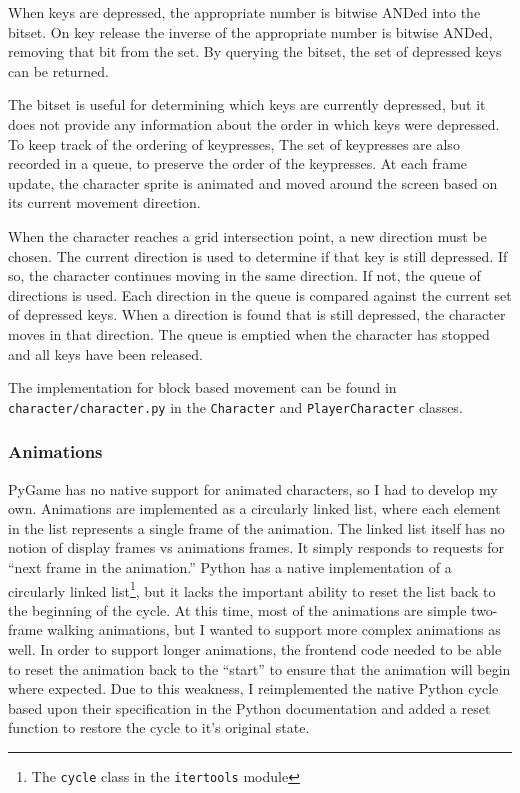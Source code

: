\documentclass[11pt]{article}
\begin{document}
When keys are depressed, the appropriate number is bitwise ANDed into the bitset.  On key release the inverse of the appropriate number is bitwise ANDed, removing that bit from the set.  By querying the bitset, the set of depressed keys can be returned.

The bitset is useful for determining which keys are currently depressed, but it does not provide any information about the order in which keys were depressed.  To keep track of the ordering of keypresses, The set of keypresses are also recorded in a queue, to preserve the order of the keypresses.  At each frame update, the character sprite is animated and moved around the screen based on its current movement direction.  

When the character reaches a grid intersection point, a new direction must be chosen.  The current direction is used to determine if that key is still depressed. If so, the character continues moving in the same direction.  If not, the queue of directions is used. Each direction in the queue is compared against the current set of depressed keys.  When a direction is found that is still depressed, the character moves in that direction.  The queue is emptied when the character has stopped and all keys have been released.

The implementation for block based movement can be found in \texttt{character/character.py} in the \texttt{Character} and \texttt{PlayerCharacter} classes.

\subsubsection{Animations}

PyGame has no native support for animated characters, so I had to develop my own.  Animations are implemented as a circularly linked list, where each element in the list represents a single frame of the animation.  The linked list itself has no notion of display frames vs animations frames.  It simply responds to requests for ``next frame in the animation.''  Python has a native implementation of a circularly linked list\footnote{The \texttt{cycle} class in the \texttt{itertools} module}, but it lacks the important ability to reset the list back to the beginning of the cycle.  At this time, most of the animations are simple two-frame walking animations, but I wanted to support more complex animations as well.  In order to support longer animations, the frontend code needed to be able to reset the animation back to the ``start'' to ensure that the animation will begin where expected.  Due to this weakness, I reimplemented the native Python cycle based upon their specification in the Python documentation \cite{PythonCycle} and added a reset function to restore the cycle to it's original state. 
\end{document}

